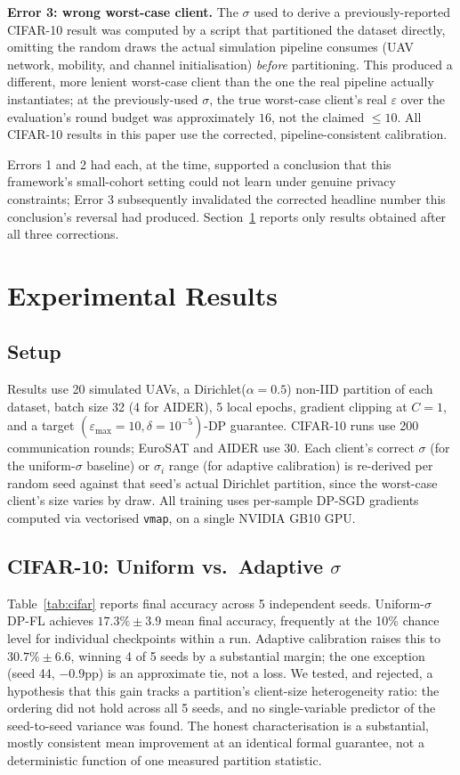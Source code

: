 \documentclass[journal]{IEEEtran}
\begin{document}
\textbf{Error 3: wrong worst-case client.} The $\sigma$ used to derive
a previously-reported CIFAR-10 result was computed by a script that
partitioned the dataset directly, omitting the random draws the actual
simulation pipeline consumes (UAV network, mobility, and channel
initialisation) \emph{before} partitioning. This produced a different,
more lenient worst-case client than the one the real pipeline actually
instantiates; at the previously-used $\sigma$, the true worst-case
client's real $\varepsilon$ over the evaluation's round budget was
approximately $16$, not the claimed $\le10$. All CIFAR-10 results in
this paper use the corrected, pipeline-consistent calibration.

Errors 1 and 2 had each, at the time, supported a conclusion that this
framework's small-cohort setting could not learn under genuine privacy
constraints; Error 3 subsequently invalidated the corrected headline
number this conclusion's reversal had produced. Section~\ref{sec:results}
reports only results obtained after all three corrections.

\section{Experimental Results}
\label{sec:results}

\subsection{Setup}
Results use 20 simulated UAVs, a Dirichlet($\alpha=0.5$) non-IID
partition of each dataset, batch size 32 (4 for AIDER), 5 local epochs,
gradient clipping at $C=1$, and a target $(\varepsilon_{\max}=10,
\delta=10^{-5})$-DP guarantee. CIFAR-10 runs use 200 communication
rounds; EuroSAT and AIDER use 30. Each client's correct $\sigma$ (for
the uniform-$\sigma$ baseline) or $\sigma_i$ range (for adaptive
calibration) is re-derived per random seed against that seed's actual
Dirichlet partition, since the worst-case client's size varies by
draw. All training uses per-sample DP-SGD gradients computed via
vectorised \texttt{vmap}, on a single NVIDIA GB10 GPU.

\subsection{CIFAR-10: Uniform vs.\ Adaptive $\sigma$}
Table~\ref{tab:cifar} reports final accuracy across 5 independent
seeds. Uniform-$\sigma$ DP-FL achieves $17.3\%\pm3.9$ mean final
accuracy, frequently at the 10\% chance level for individual
checkpoints within a run. Adaptive calibration raises this to
$30.7\%\pm6.6$, winning 4 of 5 seeds by a substantial margin; the one
exception (seed 44, $-0.9$pp) is an approximate tie, not a loss. We
tested, and rejected, a hypothesis that this gain tracks a partition's
client-size heterogeneity ratio: the ordering did not hold across all
5 seeds, and no single-variable predictor of the seed-to-seed variance
was found. The honest characterisation is a substantial, mostly
consistent mean improvement at an identical formal guarantee, not a
deterministic function of one measured partition statistic.
\end{document}
